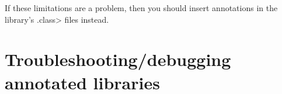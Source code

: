 If these limitations are a problem, then you should insert annotations
in the library's \<.class> files instead.







%
%
%
%
%
%
%


\section{Troubleshooting/debugging annotated libraries\label{libraries-troubleshooting}}

